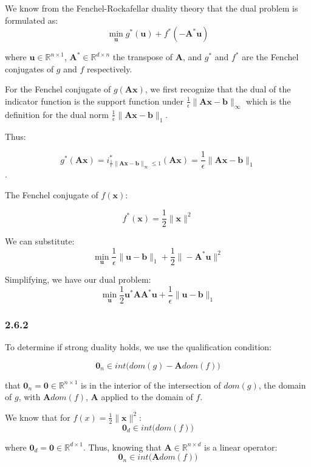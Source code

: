 \documentclass[12pt]{article}
\begin{document}
We know from the Fenchel-Rockafellar duality theory that the dual problem is formulated as:
\[\min_{\textbf{u}}  g^*(\textbf{u}) + f^*(-\textbf{A}^*\textbf{u})\]

where $\textbf{u} \in \mathbb{R}^{n \times 1}$, $\textbf{A}^* \in \mathbb{R}^{d\times n}$ the transpose of $\textbf{A}$, and $g^*$ and $f^*$ are the Fenchel conjugates of $g$ and $f$ respectively.

For the Fenchel conjugate of $g(\textbf{Ax})$, we first recognize that the dual of the indicator function is the support function under $\frac{1}{\epsilon}\|\textbf{A}\textbf{x} - \textbf{b}\|_{\infty}$ which is the definition for the dual norm $\frac{1}{\epsilon}\|\textbf{A}\textbf{x} - \textbf{b}\|_{1}$.

Thus:

\[g^*(\textbf{Ax}) = i^*_{\frac{1}{\epsilon}\|\textbf{A}\textbf{x} - \textbf{b}\|_{\infty} \leq 1}\left(\textbf{Ax}\right) = \frac{1}{\epsilon} \| \textbf{A}\textbf{x} - \textbf{b}\|_1\].

The Fenchel conjugate of $f(\textbf{x})$:

\[f^*(\textbf{x}) =  \frac{1}{2}\|\textbf{x}\|^2\]

We can substitute:
\[\min_{\textbf{u}}  \frac{1}{\epsilon} \| \textbf{u} - \textbf{b}\|_1 +  \frac{1}{2}\|-\textbf{A}^*\textbf{u}\|^2\]

Simplifying, we have our dual problem:
\[\min_{\textbf{u}} \frac{1}{2}\textbf{u}^*\textbf{A}\textbf{A}^*\textbf{u} + \frac{1}{\epsilon} \| \textbf{u} - \textbf{b}\|_1\]

\subsubsection*{2.6.2}

To determine if strong duality holds, we use the qualification condition:

\[\textbf{0}_n \in int \big(dom(g) - \textbf{A}dom(f)\big)\]

that $\textbf{0}_n = \textbf{0} \in \mathbb{R}^{n \times 1}$ is in the interior of the intersection of  $dom(g)$, the domain of $g$, with $\textbf{A}dom(f)$, $\textbf{A}$ applied to the domain of $f$.

We know that for $f(x) = \frac{1}{2}\|\textbf{x}\|^2$:
\[\textbf{0}_d \in int \big(dom(f)\big)\]

where $\textbf{0}_d = \textbf{0} \in \mathbb{R}^{d \times 1}$. Thus, knowing that $\textbf{A} \in \mathbb{R}^{n\times d}$ is a linear operator:
\[\textbf{0}_n \in int \big(\textbf{A} dom(f)\big)\]
\end{document}
